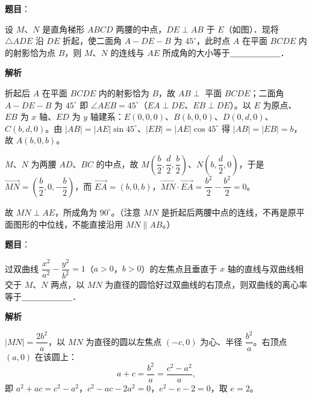 \begin{answer}

\textbf{题目}：

设 $M$、$N$ 是直角梯形 $ABCD$ 两腰的中点，$DE \perp AB$ 于 $E$（如图）．现将 $\triangle ADE$ 沿 $DE$ 折起，使二面角 $A - DE - B$ 为 $45^\circ$，此时点 $A$ 在平面 $BCDE$ 内的射影恰为点 $B$，则 $M$、$N$ 的连线与 $AE$ 所成角的大小等于＿＿＿＿＿＿．
\nopagebreak[4]
\begin{center}\end{center}
\nopagebreak[4]
\textbf{解析}

折起后 $A$ 在平面 $BCDE$ 内的射影恰为 $B$，故 $AB \perp$ 平面 $BCDE$；二面角 $A-DE-B$ 为 $45^\circ$ 即 $\angle AEB = 45^\circ$（$EA \perp DE$、$EB \perp DE$）。以 $E$ 为原点、$EB$ 为 $x$ 轴、$ED$ 为 $y$ 轴建系：$E(0,0,0)$、$B(b,0,0)$、$D(0,d,0)$、$C(b,d,0)$。由 $|AB| = |AE|\sin 45^\circ$、$|EB| = |AE|\cos 45^\circ$ 得 $|AB| = |EB| = b$，故 $A(b,0,b)$。

$M$、$N$ 为两腰 $AD$、$BC$ 的中点，故 $M\left(\dfrac b2, \dfrac d2, \dfrac b2\right)$、$N\left(b, \dfrac d2, 0\right)$，于是 $\overrightarrow{MN} = \left(\dfrac b2, 0, -\dfrac b2\right)$，而 $\overrightarrow{EA} = (b, 0, b)$，$\overrightarrow{MN} \cdot \overrightarrow{EA} = \dfrac{b^2}{2} - \dfrac{b^2}{2} = 0$。

故 $MN \perp AE$，所成角为 $90^\circ$。（注意 $MN$ 是折起后两腰中点的连线，不再是原平面图形的中位线，不能直接沿用 $MN \parallel AB$。）


\end{answer}
\begin{answer}

\textbf{题目}：

过双曲线 $\dfrac{x^2}{a^2} - \dfrac{y^2}{b^2} = 1$（$a > 0$，$b > 0$）的左焦点且垂直于 $x$ 轴的直线与双曲线相交于 $M$、$N$ 两点，以 $MN$ 为直径的圆恰好过双曲线的右顶点，则双曲线的离心率等于＿＿＿＿＿＿．

\textbf{解析}

$|MN| = \dfrac{2b^2}{a}$，以 $MN$ 为直径的圆以左焦点 $(-c, 0)$ 为心、半径 $\dfrac{b^2}{a}$。右顶点 $(a, 0)$ 在该圆上：
\nopagebreak[4]
\[
a + c = \frac{b^2}{a} = \frac{c^2 - a^2}{a},
\]
即 $a^2 + ac = c^2 - a^2$，$c^2 - ac - 2a^2 = 0$，$e^2 - e - 2 = 0$，取 $e = 2$。


\end{answer}

